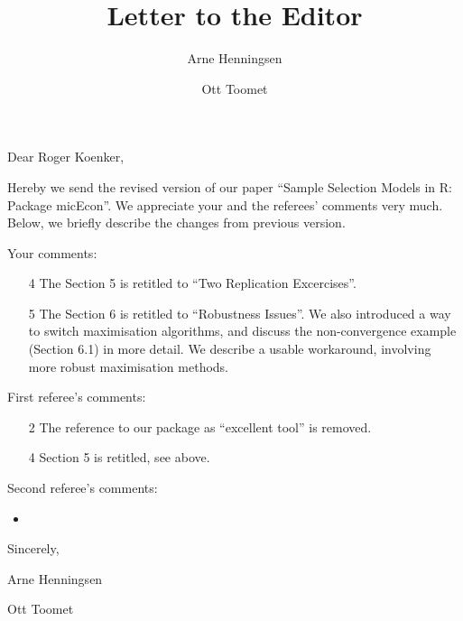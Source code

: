 \documentclass[a4paper]{article}
\title{Letter to the Editor}
\author{Arne Henningsen \and Ott Toomet}
\begin{document}
\maketitle

Dear Roger Koenker,

Hereby we send the revised version of our paper ``Sample Selection
Models in R: Package micEcon''.  We appreciate your and the referees'
comments very much.  Below, we briefly describe the changes from
previous version.

Your comments:

\begin{itemize}
\item[4] The Section 5 is retitled to ``Two Replication Excercises''.
\item[5] The Section 6 is retitled to ``Robustness Issues''.  We also
  introduced a way to switch maximisation algorithms, and discuss the
  non-convergence example (Section 6.1) in more detail.  We describe a
  usable workaround, involving more robust maximisation methods.
\end{itemize}

First referee's comments:

\begin{itemize}
\item[2] The reference to our package as ``excellent tool'' is removed.
\item[4] Section 5 is retitled, see above.
\end{itemize}

Second referee's comments:

\begin{itemize}
\item 
\end{itemize}

Sincerely,

Arne Henningsen

Ott Toomet



\end{document}
